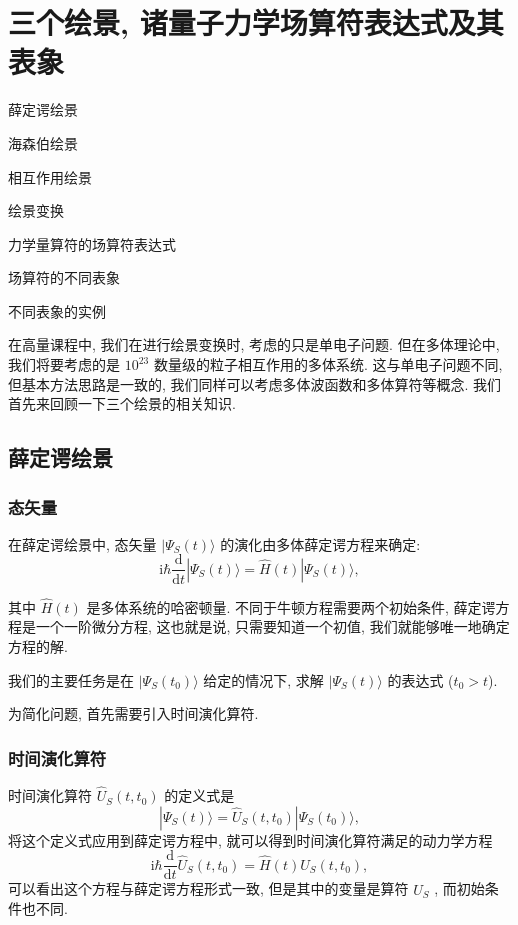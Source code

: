 \chapter{三个绘景, 诸量子力学场算符表达式及其表象}
\begin{introduction}
\item 薛定谔绘景
\item 海森伯绘景
\item 相互作用绘景
\item 绘景变换
\item 力学量算符的场算符表达式
\item 场算符的不同表象
\item 不同表象的实例
\end{introduction}
在高量课程中, 我们在进行绘景变换时, 考虑的只是单电子问题. 但在多体理论中, 我们将要考虑的是 $10^{23}$ 数量级的粒子相互作用的多体系统. 这与单电子问题不同, 但基本方法思路是一致的, 我们同样可以考虑多体波函数和多体算符等概念. 我们首先来回顾一下三个绘景的相关知识. 

\section{薛定谔绘景}

\subsection{态矢量}

在薛定谔绘景中, 态矢量 $|\Psi_S(t)\rangle$ 的演化由多体薛定谔方程来确定: 
\begin{equation}
   \mathrm{i}\hbar\frac{\mathrm{d}}{\mathrm dt}|\Psi_S(t)\rangle=\hat{H}(t)|\Psi_S(t)\rangle, 
\end{equation}

其中 $\hat H(t)$ 是多体系统的哈密顿量. 不同于牛顿方程需要两个初始条件, 薛定谔方程是一个一阶微分方程, 这也就是说, 只需要知道一个初值, 我们就能够唯一地确定方程的解. 

我们的主要任务是在 $|\Psi_S(t_0)\rangle$ 给定的情况下, 求解 $|\Psi_S(t)\rangle$ 的表达式 ($t_0>t$). 

为简化问题, 首先需要引入时间演化算符. 

\subsection{时间演化算符}

时间演化算符 $\hat U_S(t, t_0)$ 的定义式是
\begin{equation}
   |\Psi_S(t)\rangle=\hat U_S(t, t_0)|\Psi_S(t_0)\rangle, 
\end{equation}
将这个定义式应用到薛定谔方程中, 就可以得到时间演化算符满足的动力学方程
\begin{equation}
   \mathrm{i}\hbar\frac{\mathrm{d}}{\mathrm{d} t}\hat U_S(t, t_0)=\hat H(t)\hat U_S(t, t_0), 
\end{equation}
可以看出这个方程与薛定谔方程形式一致, 但是其中的变量是算符 $\hat U_S$ , 而初始条件也不同. 

